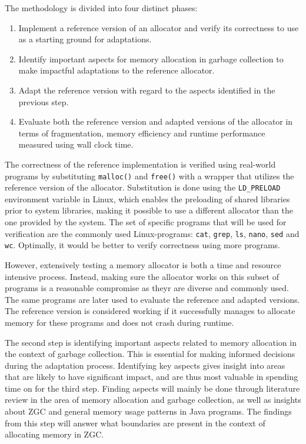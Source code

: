 
The methodology is divided into four distinct phases:

\begin{enumerate}
    \item Implement a reference version of an allocator and verify its correctness to use as a starting ground for adaptations.
    \item Identify important aspects for memory allocation in garbage collection to make impactful adaptations to the reference allocator.
    \item Adapt the reference version with regard to the aspects identified in the previous step.
    \item Evaluate both the reference version and adapted versions of the allocator in terms of fragmentation, memory efficiency and runtime performance measured using wall clock time.
\end{enumerate}

The correctness of the reference implementation is verified using real-world programs by substituting \texttt{malloc()} and \texttt{free()} with a wrapper that utilizes the reference version of the allocator. Substitution is done using the \texttt{LD\_PRELOAD} environment variable in Linux, which enables the preloading of shared libraries prior to system libraries, making it possible to use a different allocator than the one provided by the system. The set of specific programs that will be used for verification are the commonly used Linux-programs: \texttt{cat}, \texttt{grep}, \texttt{ls}, \texttt{nano}, \texttt{sed} and \texttt{wc}. Optimally, it would be better to verify correctness using more programs.

However, extensively testing a memory allocator is both a time and resource intensive process. Instead, making sure the allocator works on this subset of programs is a reasonable compromise as theyr are diverse and commonly used. The same programs are later used to evaluate the reference and adapted versions. The reference version is considered working if it successfully manages to allocate memory for these programs and does not crash during runtime.

The second step is identifying important aspects related to memory allocation in the context of garbage collection. This is essential for making informed decisions during the adaptation process. Identifying key aspects gives insight into areas that are likely to have significant impact, and are thus most valuable in spending time on for the third step. Finding aspects will mainly be done through literature review in the area of memory allocation and garbage collection, as well as insights about ZGC and general memory usage patterns in Java programs. The findings from this step will answer what boundaries are present in the context of allocating memory in ZGC.

